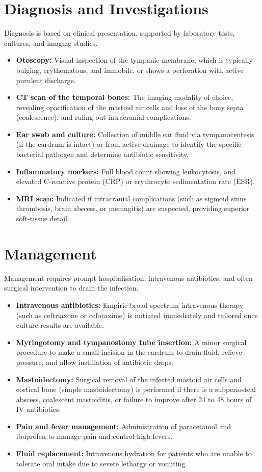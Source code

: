 \section*{Diagnosis and Investigations}
Diagnosis is based on clinical presentation, supported by laboratory tests, cultures, and imaging studies.
\begin{itemize}
    \item \textbf{Otoscopy:} Visual inspection of the tympanic membrane, which is typically bulging, erythematous, and immobile, or shows a perforation with active purulent discharge.
    \item \textbf{CT scan of the temporal bones:} The imaging modality of choice, revealing opacification of the mastoid air cells and loss of the bony septa (coalescence), and ruling out intracranial complications.
    \item \textbf{Ear swab and culture:} Collection of middle ear fluid via tympanocentesis (if the eardrum is intact) or from active drainage to identify the specific bacterial pathogen and determine antibiotic sensitivity.
    \item \textbf{Inflammatory markers:} Full blood count showing leukocytosis, and elevated C-reactive protein (CRP) or erythrocyte sedimentation rate (ESR).
    \item \textbf{MRI scan:} Indicated if intracranial complications (such as sigmoid sinus thrombosis, brain abscess, or meningitis) are suspected, providing superior soft-tissue detail.
\end{itemize}

\section*{Management}
Management requires prompt hospitalisation, intravenous antibiotics, and often surgical intervention to drain the infection.
\begin{itemize}
    \item \textbf{Intravenous antibiotics:} Empiric broad-spectrum intravenous therapy (such as ceftriaxone or cefotaxime) is initiated immediately and tailored once culture results are available.
    \item \textbf{Myringotomy and tympanostomy tube insertion:} A minor surgical procedure to make a small incision in the eardrum to drain fluid, relieve pressure, and allow instillation of antibiotic drops.
    \item \textbf{Mastoidectomy:} Surgical removal of the infected mastoid air cells and cortical bone (simple mastoidectomy) is performed if there is a subperiosteal abscess, coalescent mastoiditis, or failure to improve after 24 to 48 hours of IV antibiotics.
    \item \textbf{Pain and fever management:} Administration of paracetamol and ibuprofen to manage pain and control high fevers.
    \item \textbf{Fluid replacement:} Intravenous hydration for patients who are unable to tolerate oral intake due to severe lethargy or vomiting.
\end{itemize}


